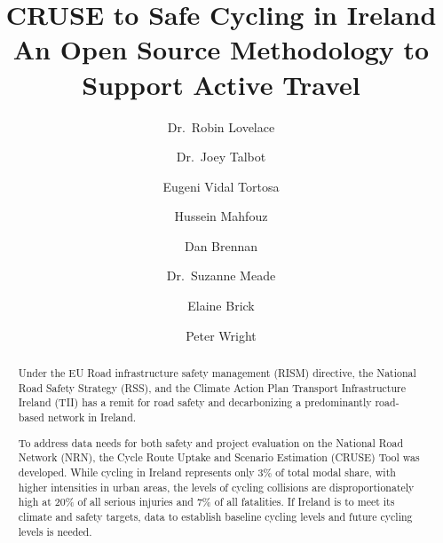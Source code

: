 \documentclass[
  super,
  preprint,
  3p]{elsarticle}
\begin{document}
\begin{frontmatter}
\title{CRUSE to Safe Cycling in Ireland \\\large{An Open Source
Methodology to Support Active Travel} }
\author[1]{Dr.~Robin Lovelace%
%
}
\author[1]{Dr.~Joey Talbot%
%
}

\author[1]{Eugeni Vidal Tortosa%
%
}

\author[1]{Hussein Mahfouz%
%
}

\author[2]{Dan Brennan%
%
}

\author[2]{Dr.~Suzanne Meade%
%
}

\author[3]{Elaine Brick%
%
}

\author[4]{Peter Wright%
%
}











        
\begin{abstract}
Under the EU Road infrastructure safety management (RISM) directive, the
National Road Safety Strategy (RSS), and the Climate Action Plan
Transport Infrastructure Ireland (TII) has a remit for road safety and
decarbonizing a predominantly road-based network in Ireland.

To address data needs for both safety and project evaluation on the
National Road Network (NRN), the Cycle Route Uptake and Scenario
Estimation (CRUSE) Tool was developed. While cycling in Ireland
represents only 3\% of total modal share, with higher intensities in
urban areas, the levels of cycling collisions are disproportionately
high at 20\% of all serious injuries and 7\% of all fatalities. If
Ireland is to meet its climate and safety targets, data to establish
baseline cycling levels and future cycling levels is needed.


\end{abstract}
\end{frontmatter}
\end{document}
